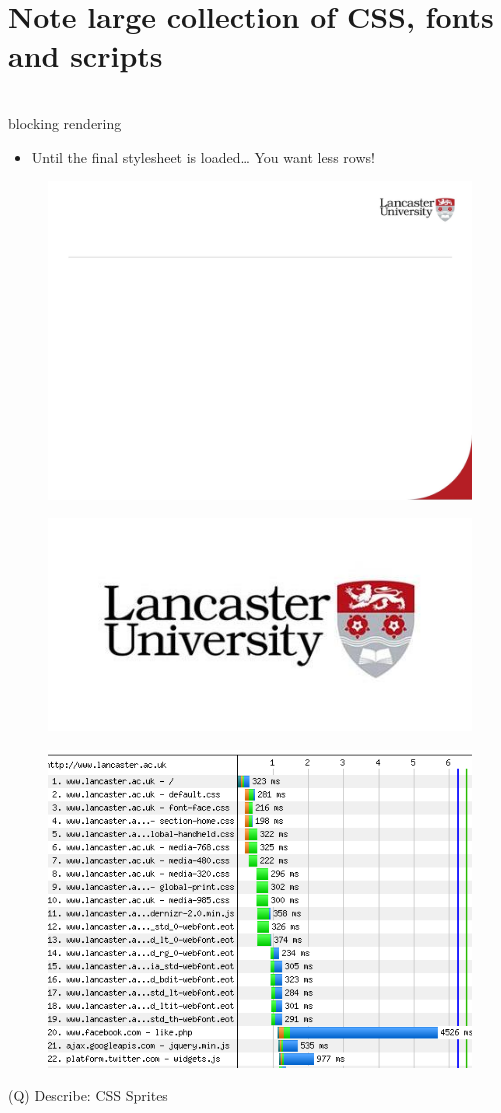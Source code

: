 \documentclass[12pt]{article}
\begin{document}
\section{Note large collection of CSS, fonts and scripts }
\\
blocking rendering\\
\begin{itemize}
  \item Until the final stylesheet is loaded…  You want less rows!
\end{itemize}
\begin{figure}[H]
\includegraphics[width=0.5\linewidth]{page51-image-1.png}
\end{figure}
\begin{figure}[H]
\includegraphics[width=0.5\linewidth]{page51-image-2.png}
\end{figure}
\begin{figure}[H]
\includegraphics[width=0.5\linewidth]{page51-image-3.png}
\end{figure}
\clearpage
(Q)
Describe: CSS Sprites
\clearpage
\end{document}
